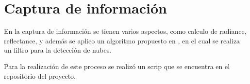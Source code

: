 \section{Captura de información}

En la captura de información se tienen varios aspectos, como calculo de radiance, reflectance, y además se aplico un 
algoritmo propuesto en \cite{irish2000landsat}, en el cual se realiza un filtro para la detección de nubes.

Para la realización de este proceso se realizó un scrip que se encuentra en el repositorio del proyecto.


